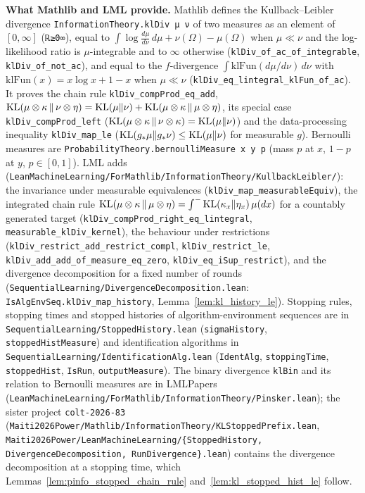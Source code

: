 \textbf{What Mathlib and LML provide.} Mathlib defines the Kullback--Leibler divergence
\texttt{InformationTheory.klDiv μ ν} of two measures as an element of $[0, \infty]$
(\texttt{ℝ≥0∞}), equal to $\int \log\frac{d\mu}{d\nu}\,d\mu + \nu(\Omega) - \mu(\Omega)$ when
$\mu \ll \nu$ and the log-likelihood ratio is $\mu$-integrable and to $\infty$ otherwise
(\texttt{klDiv\_of\_ac\_of\_integrable}, \texttt{klDiv\_of\_not\_ac}), and equal to the
$f$-divergence $\int \mathrm{klFun}(d\mu/d\nu)\,d\nu$ with $\mathrm{klFun}(x) = x\log x + 1 - x$
when $\mu \ll \nu$ (\texttt{klDiv\_eq\_lintegral\_klFun\_of\_ac}). It proves the chain rule
\texttt{klDiv\_compProd\_eq\_add}, $\mathrm{KL}(\mu\otimes\kappa\,\|\,\nu\otimes\eta) = \mathrm{KL}(\mu\|\nu) +
\mathrm{KL}(\mu\otimes\kappa\,\|\,\mu\otimes\eta)$, its special case \texttt{klDiv\_compProd\_left}
($\mathrm{KL}(\mu\otimes\kappa\,\|\,\nu\otimes\kappa) = \mathrm{KL}(\mu\|\nu)$) and the data-processing
inequality \texttt{klDiv\_map\_le} ($\mathrm{KL}(g_*\mu\|g_*\nu) \le \mathrm{KL}(\mu\|\nu)$ for measurable $g$).
Bernoulli measures are \texttt{ProbabilityTheory.bernoulliMeasure x y p} (mass $p$ at $x$,
$1 - p$ at $y$, $p \in [0,1]$). LML adds
(\texttt{LeanMachineLearning/ForMathlib/InformationTheory/KullbackLeibler/}): the invariance
under measurable equivalences (\texttt{klDiv\_map\_measurableEquiv}), the integrated chain rule
$\mathrm{KL}(\mu\otimes\kappa\,\|\,\mu\otimes\eta) = \int^- \mathrm{KL}(\kappa_x\|\eta_x)\,\mu(dx)$ for a countably
generated target (\texttt{klDiv\_compProd\_right\_eq\_lintegral},
\texttt{measurable\_klDiv\_kernel}), the behaviour under restrictions
(\texttt{klDiv\_restrict\_add\_restrict\_compl}, \texttt{klDiv\_restrict\_le},
\texttt{klDiv\_add\_add\_of\_measure\_eq\_zero}, \texttt{klDiv\_eq\_iSup\_restrict}), and the
divergence decomposition for a fixed number of rounds
(\texttt{SequentialLearning/DivergenceDecomposition.lean}:
\texttt{IsAlgEnvSeq.klDiv\_map\_history}, Lemma~\ref{lem:kl_history_le}). Stopping rules,
stopping times and stopped histories of algorithm-environment sequences are in
\texttt{SequentialLearning/StoppedHistory.lean} (\texttt{sigmaHistory},
\texttt{stoppedHistMeasure}) and identification algorithms in
\texttt{SequentialLearning/IdentificationAlg.lean} (\texttt{IdentAlg}, \texttt{stoppingTime},
\texttt{stoppedHist}, \texttt{IsRun}, \texttt{outputMeasure}). The binary divergence
\texttt{klBin} and its relation to Bernoulli measures are in LMLPapers
(\texttt{LeanMachineLearning/ForMathlib/InformationTheory/Pinsker.lean}); the sister project
\texttt{colt-2026-83} (\texttt{Maiti2026Power/Mathlib/InformationTheory/KLStoppedPrefix.lean},
\texttt{Maiti2026Power/LeanMachineLearning/\{StoppedHistory, DivergenceDecomposition,
RunDivergence\}.lean}) contains the divergence decomposition at a stopping time, which
Lemmas~\ref{lem:pinfo_stopped_chain_rule} and~\ref{lem:kl_stopped_hist_le} follow.

